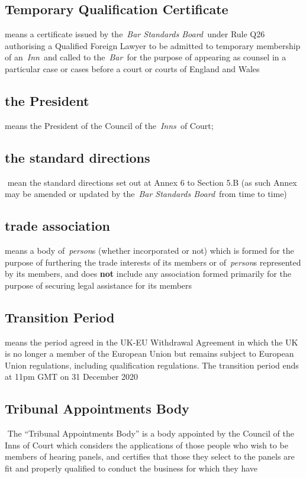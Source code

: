    \subsection{Temporary Qualification Certificate } means a certificate
  issued by the~\emph{Bar Standards Board~}under Rule Q26 authorising a
  Qualified Foreign Lawyer to be admitted to temporary membership of
  an~\emph{Inn~}and called to the~\emph{Bar~}for the purpose of
  appearing as counsel in a particular case or cases before a court or
  courts of England and Wales  \subsection{the President } means the President of the Council of
  the~\emph{Inns~}of Court;  \subsection{the standard directions } mean the standard directions set
  out at Annex 6 to Section 5.B (as such Annex may be amended or updated
  by the~\emph{Bar Standards Board}~from time to time)  \subsection{trade association } means a body of~\emph{person}s (whether
  incorporated or not) which is formed for the purpose of furthering the
  trade interests of its members or of~\emph{person}s represented by its
  members, and does \textbf{not} include any association formed primarily for the
  purpose of securing legal assistance for its members  \subsection{Transition Period }means the period agreed in the UK-EU
  Withdrawal Agreement in which the UK is no longer a member of the
  European Union but remains subject to European Union regulations,
  including qualification regulations. The transition period ends at
  11pm GMT on 31 December 2020 \subsection{Tribunal Appointments Body } The ``Tribunal Appointments
  Body'' is a body appointed by the Council of the Inns of Court which
  considers the applications of those people who wish to be members of
  hearing panels, and certifies that those they select to the panels are
  fit and properly qualified to conduct the business for which they have
